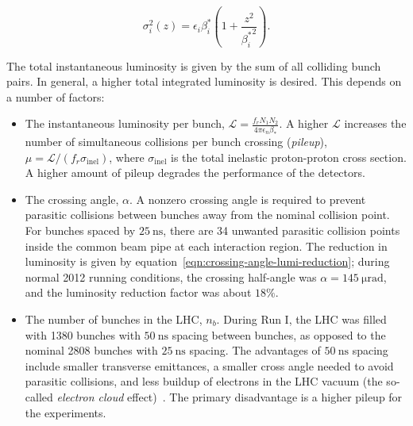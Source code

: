 \begin{equation}
	\sigma_i^2(z)= \epsilon_i \beta^*_i\left(1+\frac{z^2}{{\beta_i^*}^2}\right).
\end{equation}

The total instantaneous luminosity is given by the sum of all colliding bunch pairs. In general, a higher total integrated luminosity is desired. This depends on a number of factors:

\begin{itemize}
	\item The instantaneous luminosity per bunch, $\mathcal{L}=\frac{f_r N_1 N_2}{4\pi\epsilon_n \beta_{*}}$. A higher $\mathcal{L}$ increases the number of simultaneous collisions per bunch crossing (\emph{pileup}), $\mu=\mathcal{L}/(f_r \sigma_{\mathrm{inel}})$, where $\sigma_{\mathrm{inel}}$ is the total inelastic proton-proton cross section. A higher amount of pileup degrades the performance of the detectors. 

	\item The crossing angle, $\alpha$. A nonzero crossing angle is required to prevent parasitic collisions between bunches away from the nominal collision point. For bunches spaced by $\SI{25}{\nano\second}$, there are 34 unwanted parasitic collision points inside the common beam pipe at each interaction region. The reduction in luminosity is given by equation~\ref{eqn:crossing-angle-lumi-reduction}; during normal 2012 running conditions, the crossing half-angle was $\alpha=\SI{145}{\micro\radian}$, and the luminosity reduction factor was about $18\%$. 

	\item The number of bunches in the LHC, $n_b$. During Run I, the LHC was filled with 1380 bunches with $\SI{50}{\nano\second}$ spacing between bunches, as opposed to the nominal 2808 bunches with $\SI{25}{\nano\second}$ spacing. The advantages of $\SI{50}{\nano\second}$ spacing include smaller transverse emittances, a smaller cross angle needed to avoid parasitic collisions, and less buildup of electrons in the LHC vacuum (the so-called \emph{electron cloud} effect)~\cite{Papotti:2014vb}. The primary disadvantage is a higher pileup for the experiments. 


\end{itemize}
